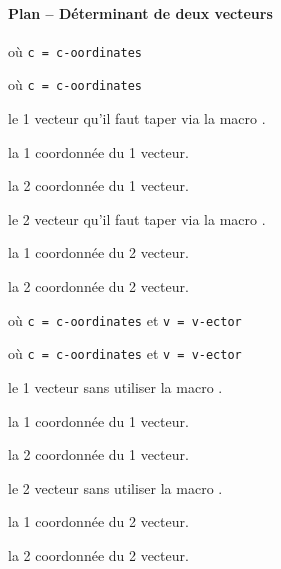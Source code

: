 \documentclass[12pt,a4paper]{article}
\begin{document}
\paragraph{Plan -- Déterminant de deux vecteurs}

  où \quad \verb+c = c-oordinates+

 où \quad \verb+c = c-oordinates+


 le 1\ier{} vecteur qu'il faut taper via la macro .

 la 1\iere{} coordonnée du 1\ier{} vecteur.

 la 2\ieme{} coordonnée du 1\ier{} vecteur.

 le 2\ieme{} vecteur qu'il faut taper via la macro .

 la 1\iere{} coordonnée du 2\ieme{} vecteur.

 la 2\ieme{} coordonnée du 2\ieme{} vecteur.


\separation


  où \quad \verb+c = c-oordinates+ 
                                et \verb+v = v-ector+

 où \quad \verb+c = c-oordinates+ 
                                et \verb+v = v-ector+


 le 1\ier{} vecteur sans utiliser la macro .

 la 1\iere{} coordonnée du 1\ier{} vecteur.

 la 2\ieme{} coordonnée du 1\ier{} vecteur.

 le 2\ieme{} vecteur sans utiliser la macro .

 la 1\iere{} coordonnée du 2\ieme{} vecteur.

 la 2\ieme{} coordonnée du 2\ieme{} vecteur.
\end{document}
